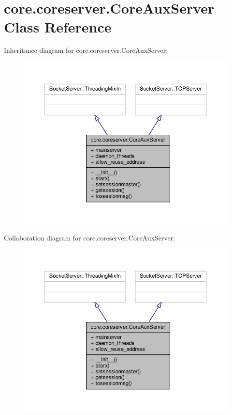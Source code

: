 \hypertarget{classcore_1_1coreserver_1_1_core_aux_server}{\section{core.\+coreserver.\+Core\+Aux\+Server Class Reference}
\label{classcore_1_1coreserver_1_1_core_aux_server}
}


Inheritance diagram for core.\+coreserver.\+Core\+Aux\+Server\+:
\nopagebreak
\begin{figure}[H]
\begin{center}
\leavevmode
\includegraphics[width=350pt]{classcore_1_1coreserver_1_1_core_aux_server__inherit__graph}
\end{center}
\end{figure}


Collaboration diagram for core.\+coreserver.\+Core\+Aux\+Server\+:
\nopagebreak
\begin{figure}[H]
\begin{center}
\leavevmode
\includegraphics[width=350pt]{classcore_1_1coreserver_1_1_core_aux_server__coll__graph}
\end{center}
\end{figure}
